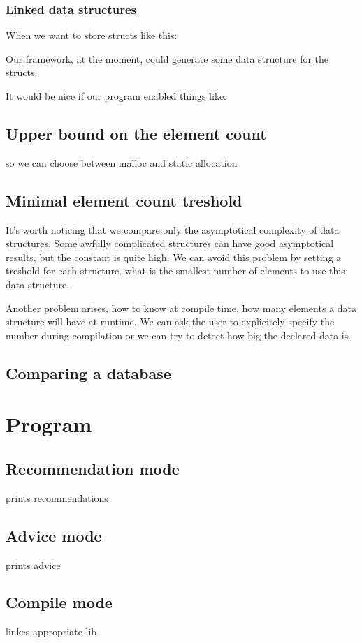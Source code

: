 \documentclass[11pt]{article}
\begin{document}
		\subsubsection{Linked data structures}
			When we want to store structs like this:
			
			Our framework, at the moment, could generate some data structure for the structs.
			
			It would be nice if our program enabled things like:
			
	\subsection{Upper bound on the element count}
		so we can choose between malloc and static allocation
	\subsection{Minimal element count treshold}
		It's worth noticing that we compare only the asymptotical complexity of data structures. Some awfully complicated structures can have good
		asymptotical results, but the constant is quite high. We can avoid this problem by setting a treshold for each structure, what is the smallest
		number of elements to use this data structure.

		Another problem arises, how to know at compile time, how many elements a data structure will have at runtime. We can ask the user to explicitely
		specify the number during compilation or we can try to detect how big the declared data is.
	\subsection{Comparing a database}
		\label{sub:database}
\section{Program}
	\subsection{Recommendation mode}
		prints recommendations
	\subsection{Advice mode}
		prints advice
	\subsection{Compile mode}
		linkes appropriate lib
\end{document}
